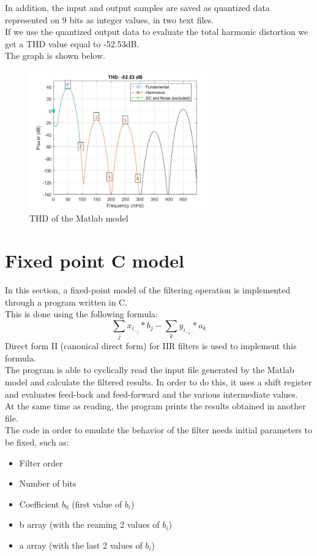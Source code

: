 In addition, the input and output samples are saved as quantized data represented on 9 bits as integer values, in two text files.\\
If we use the quantized output data to evaluate the total harmonic distortion we get a THD value equal to -52.53dB.\\
The graph is shown below.\\

\begin{figure}[H]
	\centering
	\includegraphics[width=\textwidth, height=6cm]{img/thdm.jpg} 
	\caption{THD of the Matlab model}
	\label{fig:THD} 
\end{figure}

\section{Fixed point C model}
In this section, a fixed-point model of the filtering operation is implemented through a program written in C.\\
This is done using the following formula:\\
\[\sum_{j} x_i_-_j * b_j - \sum_{k} y_i_-_k * a_k\]
Direct form II (canonical direct form) for IIR filters is used to implement this formula.\\
The program is able to cyclically read the input file generated by the Matlab model and calculate the filtered results. In order to do this, it uses a shift register and evaluates feed-back and feed-forward and the various intermediate values.\\
At the same time as reading, the program prints the results obtained in another file.\\
The code in order to emulate the behavior of the filter needs initial parameters to be fixed, such as:
\begin{itemize}
    \item Filter order
    \item Number of bits
    \item Coefficient \(b_0\) (first value of \(b_i\))
    \item b array (with the reaming 2 values of \(b_i\))
    \item a array (with the last 2 values of \(b_i\))
\end{itemize}

